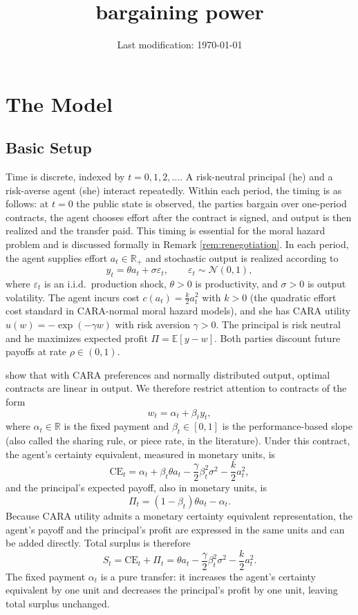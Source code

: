 \documentclass{article}
\title{bargaining power}
\author{}
\date{Last modification: \today}
\theoremstyle{definition}
\theoremstyle{plain}
\begin{document}
\maketitle
\section{The Model}
\subsection{Basic Setup}\label{subsec:setup}
Time is discrete, indexed by $t = 0,1,2,\dots$. A risk-neutral principal (he) and a risk-averse agent (she) interact repeatedly. Within each period, the timing is as follows: at $t=0$ the public state is observed, the parties bargain over one-period contracts, the agent chooses effort after the contract is signed, and output is then realized and the transfer paid. This timing is essential for the moral hazard problem and is discussed formally in Remark \ref{rem:renegotiation}. In each period, the agent supplies effort $a_t \in \mathbb{R}_+$ and stochastic output is realized according to
\[
y_t = \theta a_t + \sigma \varepsilon_t, \qquad \varepsilon_t \sim \mathcal{N}(0,1),
\]
where $\varepsilon_t$ is an i.i.d.\ production shock, $\theta > 0$ is productivity, and $\sigma > 0$ is output volatility. The agent incurs cost $c(a_t) = \frac{k}{2}a_t^2$ with $k > 0$ (the quadratic effort cost standard in CARA-normal moral hazard models), and she has CARA utility $u(w) = -\exp(-\gamma w)$ with risk aversion $\gamma > 0$. The principal is risk neutral and he maximizes expected profit $\Pi = \mathbb{E}[y - w]$. Both parties discount future payoffs at rate $\rho \in (0,1)$.

\textcite{holmstrom1987} show that with CARA preferences and normally distributed output, optimal contracts are linear in output. We therefore restrict attention to contracts of the form
\[
w_t = \alpha_t + \beta_t y_t,
\]
where $\alpha_t \in \mathbb{R}$ is the fixed payment and $\beta_t \in [0,1]$ is the performance-based slope (also called the sharing rule, or piece rate, in the literature). Under this contract, the agent's certainty equivalent, measured in monetary units, is
\[
\text{CE}_t = \alpha_t + \beta_t \theta a_t - \frac{\gamma}{2}\beta_t^2 \sigma^2 - \frac{k}{2}a_t^2,
\]
and the principal's expected payoff, also in monetary units, is
\[
\Pi_t = (1-\beta_t)\theta a_t - \alpha_t.
\]
Because CARA utility admits a monetary certainty equivalent representation, the agent's payoff and the principal's profit are expressed in the same units and can be added directly. Total surplus is therefore
\[
S_t = \text{CE}_t + \Pi_t = \theta a_t - \frac{\gamma}{2}\beta_t^2 \sigma^2 - \frac{k}{2}a_t^2.
\]
The fixed payment $\alpha_t$ is a pure transfer: it increases the agent's certainty equivalent by one unit and decreases the principal's profit by one unit, leaving total surplus unchanged.
\end{document}
